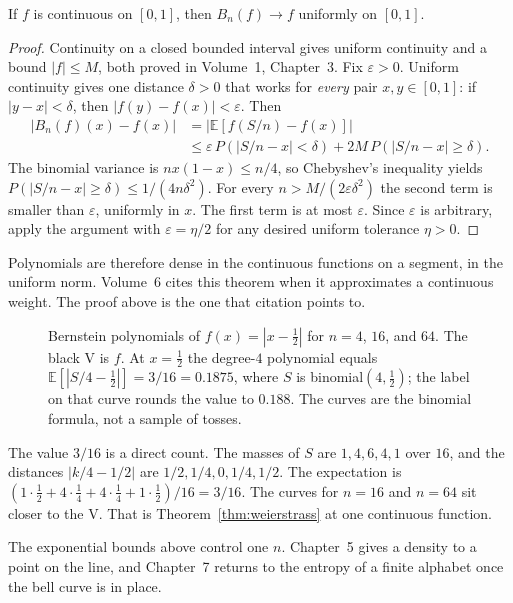 \begin{theorem}\label{thm:weierstrass}
If $f$ is continuous on $[0,1]$, then $B_n(f)\to f$ uniformly on $[0,1]$.
\end{theorem}
\begin{proof}
Continuity on a closed bounded interval gives uniform continuity and a bound $|f|\le M$, both proved in Volume~1, Chapter~3. Fix $\varepsilon>0$. Uniform continuity gives one distance $\delta>0$ that works for \emph{every} pair $x,y\in[0,1]$: if $|y-x|<\delta$, then $|f(y)-f(x)|<\varepsilon$. Then
\begin{align*}
|B_n(f)(x)-f(x)|
&=\bigl|\mathbb E[f(S/n)-f(x)]\bigr|\\
&\le\varepsilon\,P(|S/n-x|<\delta)+2M\,P(|S/n-x|\ge\delta).
\end{align*}
The binomial variance is $nx(1-x)\le n/4$, so Chebyshev's inequality yields $P(|S/n-x|\ge\delta)\le 1/(4n\delta^2)$. For every $n>M/(2\varepsilon\delta^2)$ the second term is smaller than $\varepsilon$, uniformly in $x$. The first term is at most $\varepsilon$. Since $\varepsilon$ is arbitrary, apply the argument with $\varepsilon=\eta/2$ for any desired uniform tolerance $\eta>0$.
\end{proof}

Polynomials are therefore dense in the continuous functions on a segment, in the uniform norm. Volume~6 cites this theorem when it approximates a continuous weight. The proof above is the one that citation points to.

\begin{figure}[ht]
\centering
{}
\caption{Bernstein polynomials of $f(x)=|x-\tfrac12|$ for $n=4$, $16$, and $64$. The black V is $f$. At $x=\tfrac12$ the degree-$4$ polynomial equals $\mathbb E[|S/4-\tfrac12|]=3/16=0.1875$, where $S$ is binomial$(4,\tfrac12)$; the label on that curve rounds the value to $0.188$. The curves are the binomial formula, not a sample of tosses.}
\label{fig:bernstein}
\end{figure}

The value $3/16$ is a direct count. The masses of $S$ are $1,4,6,4,1$ over $16$, and the distances $|k/4-1/2|$ are $1/2,1/4,0,1/4,1/2$. The expectation is $(1\cdot\tfrac12+4\cdot\tfrac14+4\cdot\tfrac14+1\cdot\tfrac12)/16=3/16$. The curves for $n=16$ and $n=64$ sit closer to the V. That is Theorem~\ref{thm:weierstrass} at one continuous function.

The exponential bounds above control one $n$. Chapter~5 gives a density to a point on the line, and Chapter~7 returns to the entropy of a finite alphabet once the bell curve is in place.

